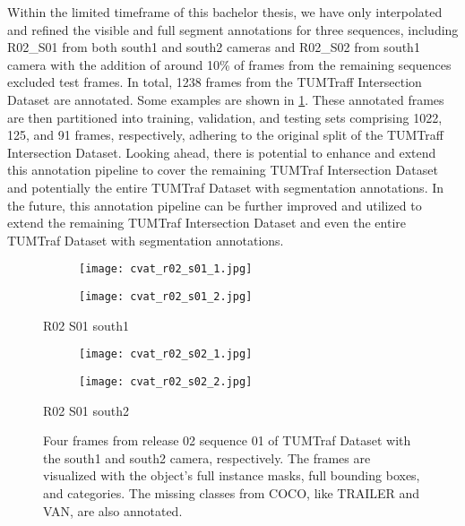 Within the limited timeframe of this bachelor thesis, we have only interpolated and refined the visible and full segment annotations for three sequences, including R02\_S01 from both south1 and south2 cameras and R02\_S02 from south1 camera with the addition of around 10\% of frames from the remaining sequences excluded test frames. In total, 1238 frames from the TUMTraff Intersection Dataset are annotated. Some examples are shown in \cref{figure:cvat_annotated_example}. These annotated frames are then partitioned into training, validation, and testing sets comprising 1022, 125, and 91 frames, respectively, adhering to the original split of the TUMTraff Intersection Dataset. Looking ahead, there is potential to enhance and extend this annotation pipeline to cover the remaining TUMTraf Intersection Dataset and potentially the entire TUMTraf Dataset with segmentation annotations. In the future, this annotation pipeline can be further improved and utilized to extend the remaining TUMTraf Intersection Dataset and even the entire TUMTraf Dataset with segmentation annotations. 

\begin{figure}[htb]  
	\centering
	\begin{subfigure}{0.48\textwidth}
		\texttt{[image: cvat\_r02\_s01\_1.jpg]}
		\vspace{-\baselineskip} %
	\end{subfigure}
	\begin{subfigure}{0.48\textwidth}
		\texttt{[image: cvat\_r02\_s01\_2.jpg]}
		\vspace{-\baselineskip} %
	\end{subfigure}
	\vspace{-0.6em}
	\caption*{R02 S01 south1}
	
	
	\begin{subfigure}{0.48\textwidth}
		\texttt{[image: cvat\_r02\_s02\_1.jpg]}
		\vspace{-\baselineskip} %
	\end{subfigure}
	\begin{subfigure}{0.48\textwidth}
		\texttt{[image: cvat\_r02\_s02\_2.jpg]}
		\vspace{-\baselineskip} %
	\end{subfigure}
	\vspace{-0.6em}
	\caption*{R02 S01 south2}
	
	\caption{Four frames from release 02 sequence 01 of TUMTraf Dataset with the south1 and south2 camera, respectively. The frames are visualized with the object's full instance masks, full bounding boxes, and categories. The missing classes from COCO, like TRAILER and VAN, are also annotated.}
	\label{figure:cvat_annotated_example}
\end{figure}



